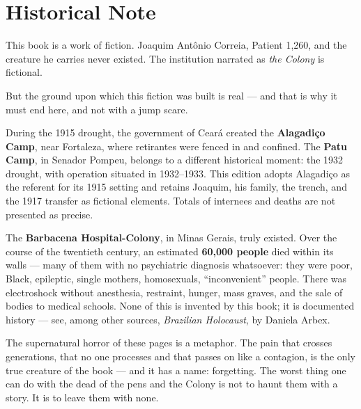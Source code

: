 \cleardoublepage
\chapter*{Historical Note}
\label{nota-historica}

\thispagestyle{empty}

\noindent This book is a work of fiction. Joaquim Antônio Correia, Patient
1,260, and the creature he carries never existed. The institution narrated
as \textit{the Colony} is fictional.

\vspace{0.8em}

\noindent But the ground upon which this fiction was built is real --- and
that is why it must end here, and not with a jump scare.

\vspace{0.8em}

\noindent During the 1915 drought, the government of Ceará created the
\textbf{Alagadiço Camp}, near Fortaleza, where retirantes were fenced in
and confined. The \textbf{Patu Camp}, in Senador Pompeu, belongs to a
different historical moment: the 1932 drought, with operation situated in
1932--1933. This edition adopts Alagadiço as the referent for its 1915
setting and retains Joaquim, his family, the trench, and the 1917 transfer
as fictional elements. Totals of internees and deaths are not presented as
precise.

\vspace{0.8em}

\noindent The \textbf{Barbacena Hospital-Colony}, in Minas Gerais, truly
existed. Over the course of the twentieth century, an estimated
\textbf{60,000 people} died within its walls --- many of them with no
psychiatric diagnosis whatsoever: they were poor, Black, epileptic,
single mothers, homosexuals, ``inconvenient'' people. There was
electroshock without anesthesia, restraint, hunger, mass graves, and the
sale of bodies to medical schools. None of this is invented by this book;
it is documented history --- see, among other sources, \textit{Brazilian
Holocaust}, by Daniela Arbex.

\vspace{0.8em}

\noindent The supernatural horror of these pages is a metaphor. The pain
that crosses generations, that no one processes and that passes on like a
contagion, is the only true creature of the book --- and it has a name:
forgetting. The worst thing one can do with the dead of the pens and the
Colony is not to haunt them with a story. It is to leave them with none.


